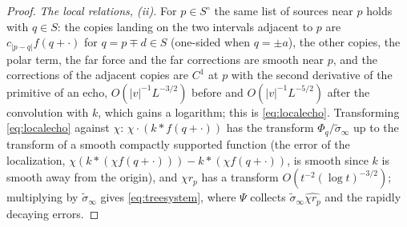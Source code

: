 \documentclass[11pt]{article}
\theoremstyle{definition}
\theoremstyle{remark}
\begin{document}
\begin{proof}
\emph{The local relations, (ii).} For $p\in S^\circ$ the same list of sources near $p$ holds with $q\in S$: the copies landing on the two intervals adjacent to $p$ are $c_{|p-q|}f(q+\cdot)$ for $q=p\mp d\in S$ (one-sided when $q=\pm a$), the other copies, the polar term, the far force and the far corrections are smooth near $p$, and the corrections of the adjacent copies are $C^1$ at $p$ with the second derivative of the primitive of an echo, $O(|v|^{-1}L^{-3/2})$ before and $O(|v|^{-1}L^{-5/2})$ after the convolution with $k$, which gains a logarithm; this is \eqref{eq:localecho}. Transforming \eqref{eq:localecho} against $\chi$: $\chi\cdot(k*f(q+\cdot))$ has the transform $\Phi_q/\tilde\sigma_\infty$ up to the transform of a smooth compactly supported function (the error of the localization, $\chi(k*(\chi f(q+\cdot)))-k*(\chi f(q+\cdot))$, is smooth since $k$ is smooth away from the origin), and $\chi r_p$ has a transform $O(t^{-2}(\log t)^{-3/2})$; multiplying by $\tilde\sigma_\infty$ gives \eqref{eq:treesystem}, where $\Psi$ collects $\tilde\sigma_\infty\widehat{\chi r_p}$ and the rapidly decaying errors.


\end{proof}
\end{document}
